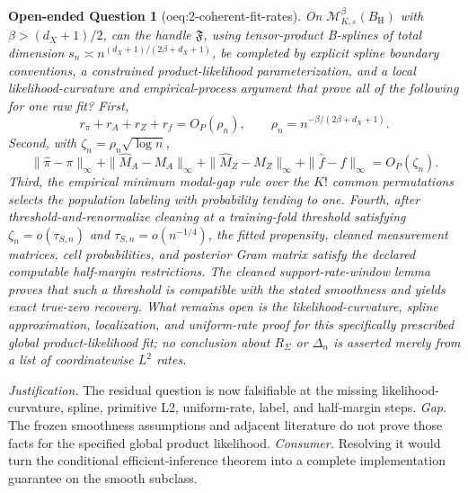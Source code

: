 \documentclass{article}
\newtheorem{openendedquestion}{Open-ended Question}
\begin{document}
\begin{openendedquestion}[oeq:2-coherent-fit-rates]\label{oeq:2-coherent-fit-rates}
On \(\mathcal M^{\beta}_{K,\varepsilon}(B_{\mathrm H})\) with \(\beta>(d_X+1)/2\), can the handle \(\mathfrak F\), using tensor-product B-splines of total dimension \(s_n\asymp n^{(d_X+1)/(2\beta+d_X+1)}\), be completed by explicit spline boundary conventions, a constrained product-likelihood parameterization, and a local likelihood-curvature and empirical-process argument that prove all of the following for one raw fit?  First,
\[
 r_\pi+r_A+r_Z+r_f=O_P(\rho_n),
 \qquad \rho_n=n^{-\beta/(2\beta+d_X+1)}.
\]
Second, with \(\zeta_n=\rho_n\sqrt{\log n}\),
\[
 \|\widehat\pi-\pi\|_\infty+
 \|\widehat M_A-M_A\|_\infty+
 \|\widehat M_Z-M_Z\|_\infty+
 \|\widehat f-f\|_\infty=O_P(\zeta_n).
\]
Third, the empirical minimum modal-gap rule over the \(K!\) common permutations selects the population labeling with probability tending to one.  Fourth, after threshold-and-renormalize cleaning at a training-fold threshold satisfying \(\zeta_n=o(\tau_{S,n})\) and \(\tau_{S,n}=o(n^{-1/4})\), the fitted propensity, cleaned measurement matrices, cell probabilities, and posterior Gram matrix satisfy the declared computable half-margin restrictions.  The cleaned support-rate-window lemma proves that such a threshold is compatible with the stated smoothness and yields exact true-zero recovery.  What remains open is the likelihood-curvature, spline approximation, localization, and uniform-rate proof for this specifically prescribed global product-likelihood fit; no conclusion about \(R_\Sigma\) or \(\Delta_n\) is asserted merely from a list of coordinatewise \(L^2\) rates.
\end{openendedquestion}
\par\smallskip\noindent \textit{Justification.} The residual question is now falsifiable at the missing likelihood-curvature, spline, primitive L2, uniform-rate, label, and half-margin steps. \textit{Gap.} The frozen smoothness assumptions and adjacent literature do not prove those facts for the specified global product likelihood. \textit{Consumer.} Resolving it would turn the conditional efficient-inference theorem into a complete implementation guarantee on the smooth subclass.
\end{document}
